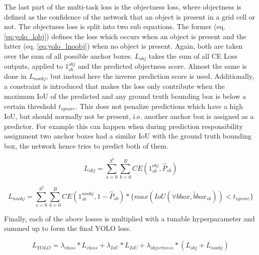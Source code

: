 The last part of the multi-task loss is the objectness loss, where objectness is defined as the confidence of the network that an object is present in a grid cell or not.
The objectness loss is split into two sub equations.
The former (eq. \ref{eq:yolo_lobj}) defines the loss which occurs when an object is present and the latter (eq. \ref{eq:yolo_lnoobj}) when no object is present.
Again, both are taken over the sum of all possible anchor boxes.
$L_{obj}$ takes the sum of all \ac{CE} Loss outputs, applied to $1_{sb}^{obj}$ and the predicted objectness score.
Almost the same is done in $L_{noobj}$, but instead here the inverse prediction score is used.
Additionally, a constraint is introduced that makes the loss only contribute when the maximum \ac{IoU} of the predicted and any ground truth bounding box is below a certain threshold $t_{ignore}$.
This does not penalize predictions which have a high \ac{IoU}, but should normally not be present, i.e. another anchor box is assigned as a predictor.
For example this can happen when during prediction responsibility assignment two anchor boxes had a similar \ac{IoU} with the ground truth bounding box, the network hence tries to predict both of them.

\begin{equation}
    L_{obj} = \sum_{s=0}^{S^2}\sum_{b=0}^{B} CE(1^{obj}_{sb}, \hat{P}_{sb})
    \label{eq:yolo_lobj}
\end{equation}

\begin{equation}
    L_{noobj} = \sum_{s=0}^{S^2}\sum_{b=0}^{B} CE(1^{noobj}_{sb}, 1 - \hat{P}_{sb}) * \{max(IoU(\forall bbox, \hat{b}box_{sb})) < t_{ignore}\}
    \label{eq:yolo_lnoobj}
\end{equation}


Finally, each of the above losses is multiplied with a tunable hyperparameter and summed up to form the final \ac{YOLO} loss.

\begin{equation}
    L_{YOLO} = \lambda_{class} * L_{class} + \lambda_{IoU} * L_{IoU} + \lambda_{objectness} * (L_{obj} + L_{noobj})
    \label{eq:yolo_loss}
\end{equation}
